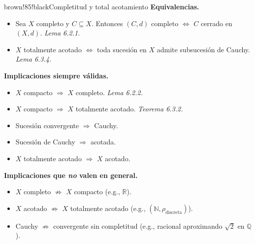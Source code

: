 \documentclass[11pt,twoside]{article}
\newcommand{\R}{\mathbb{R}}
\newcommand{\Q}{\mathbb{Q}}
\newcommand{\N}{\mathbb{N}}
\begin{document}
\begin{equivbox}{brown!85!black}{Completitud y total acotamiento}
\textbf{Equivalencias.}
\begin{itemize}[leftmargin=2em,itemsep=2pt]
\item Sea $X$ completo y $C \subseteq X$. Entonces $(C, d)$ completo $\Leftrightarrow$ $C$ cerrado en $(X, d)$. \hfill\textit{Lema 6.2.1.}
\item $X$ totalmente acotado $\Leftrightarrow$ toda sucesión en $X$ admite subsucesión de Cauchy. \hfill\textit{Lema 6.3.4.}
\end{itemize}

\textbf{Implicaciones siempre válidas.}
\begin{itemize}[leftmargin=2em,itemsep=2pt]
\item $X$ compacto $\Rightarrow$ $X$ completo. \hfill\textit{Lema 6.2.2.}
\item $X$ compacto $\Rightarrow$ $X$ totalmente acotado. \hfill\textit{Teorema 6.3.2.}
\item Sucesión convergente $\Rightarrow$ Cauchy.
\item Sucesión de Cauchy $\Rightarrow$ acotada.
\item $X$ totalmente acotado $\Rightarrow$ $X$ acotado.
\end{itemize}

\textbf{Implicaciones que \emph{no} valen en general.}
\begin{itemize}[leftmargin=2em,itemsep=2pt]
\item $X$ completo $\not\Rightarrow$ $X$ compacto (e.g., $\R$).
\item $X$ acotado $\not\Rightarrow$ $X$ totalmente acotado (e.g., $(\N, \rho_{\mathrm{discreta}})$).
\item Cauchy $\not\Rightarrow$ convergente sin completitud (e.g., racional aproximando $\sqrt{2}$ en $\Q$).
\end{itemize}
\end{equivbox}

\medskip
\end{document}
